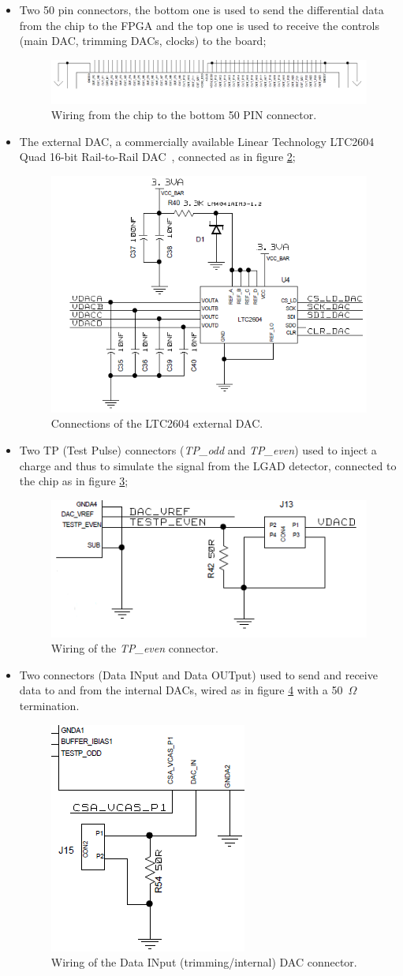 \begin{itemize}
	\item Two 50 pin connectors, the bottom one is used to send the differential data from the chip to the FPGA and the top one is used to receive the controls (main DAC, trimming DACs, clocks) to the board;
	\begin{figure}[H]
		\centering
		\includegraphics[width=0.95\linewidth]{IMG/ch5/DATATOFPGA}
		\caption{Wiring from the chip to the bottom 50 PIN connector.}
		\label{fig:datatofpga}
	\end{figure}
	\item The external DAC, a commercially available Linear Technology LTC2604 Quad 16-bit Rail-to-Rail DAC~\cite{LTC2604}, connected as in figure \ref{fig:externaldac};
	\begin{figure}[H]
		\centering
		\includegraphics[width=0.3\linewidth]{IMG/ch5/EXTERNALDAC}
		\caption{Connections of the LTC2604 external DAC.}
		\label{fig:externaldac}
	\end{figure}
	\item Two TP (Test Pulse) connectors (\textit{TP\_odd} and \textit{TP\_even}) used to inject a charge and thus to simulate the signal from the LGAD detector, connected to the chip as in figure \ref{fig:tpconnector};
	\begin{figure}[H]
		\centering
		\includegraphics[width=0.4\linewidth]{IMG/ch5/TPCONNECTOR}
		\caption{Wiring of the \textit{TP\_even} connector.}
		\label{fig:tpconnector}
	\end{figure}
	\item Two connectors (Data INput and Data OUTput) used to send and receive data to and from the internal DACs, wired as in figure \ref{fig:internaldacwiring} with a 50~$\Omega$ termination.
	\begin{figure}[H]
		\centering
		\includegraphics[width=0.2\linewidth]{IMG/ch5/INTERNALDACWIRING}
		\caption{Wiring of the Data INput (trimming/internal) DAC connector.}
		\label{fig:internaldacwiring}
	\end{figure} 
\end{itemize} 
